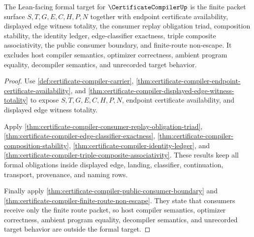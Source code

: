 \begin{theorem}
\label{thm:certificate-compiler-formal-target-surface}
The Lean-facing formal target for $\CertificateCompilerUp$ is the finite packet surface $S,T,G,E,C,H,P,N$ together with endpoint certificate availability, displayed edge witness totality, the consumer replay obligation triad, composition stability, the identity ledger, edge-classifier exactness, triple composite associativity, the public consumer boundary, and finite-route non-escape. It excludes host compiler semantics, optimizer correctness, ambient program equality, decompiler semantics, and unrecorded target behavior.
\end{theorem}
\begin{proof}
Use \autoref{def:certificate-compiler-carrier}, \autoref{thm:certificate-compiler-endpoint-certificate-availability}, and \autoref{thm:certificate-compiler-displayed-edge-witness-totality} to expose $S,T,G,E,C,H,P,N$, endpoint certificate availability, and displayed edge witness totality.

Apply \autoref{thm:certificate-compiler-consumer-replay-obligation-triad}, \autoref{thm:certificate-compiler-edge-classifier-exactness}, \autoref{thm:certificate-compiler-composition-stability}, \autoref{thm:certificate-compiler-identity-ledger}, and \autoref{thm:certificate-compiler-triple-composite-associativity}. These results keep all formal obligations inside displayed edge, landing, classifier, continuation, transport, provenance, and naming rows.

Finally apply \autoref{thm:certificate-compiler-public-consumer-boundary} and \autoref{thm:certificate-compiler-finite-route-non-escape}. They state that consumers receive only the finite route packet, so host compiler semantics, optimizer correctness, ambient program equality, decompiler semantics, and unrecorded target behavior are outside the formal target.
\end{proof}


